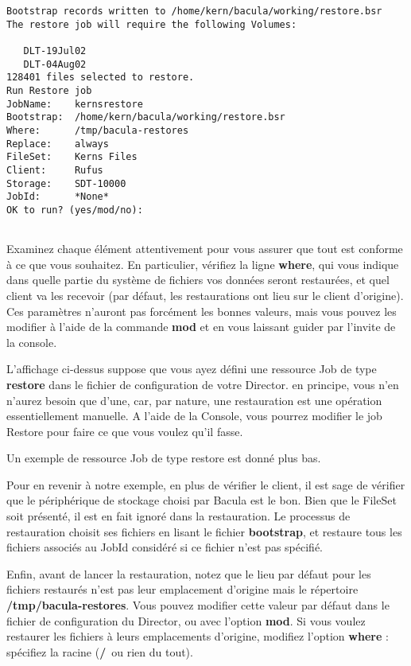 \footnotesize
\begin{verbatim}
Bootstrap records written to /home/kern/bacula/working/restore.bsr
The restore job will require the following Volumes:
   
   DLT-19Jul02
   DLT-04Aug02
128401 files selected to restore.
Run Restore job
JobName:    kernsrestore
Bootstrap:  /home/kern/bacula/working/restore.bsr
Where:      /tmp/bacula-restores
Replace:    always
FileSet:    Kerns Files
Client:     Rufus
Storage:    SDT-10000
JobId:      *None*
OK to run? (yes/mod/no):
    
\end{verbatim}
\normalsize

Examinez chaque \'el\'ement attentivement pour vous assurer que tout est 
conforme \`a ce que vous souhaitez. En particulier, v\'erifiez la ligne {\bf where}, 
qui vous indique dans quelle partie du syst\`eme de fichiers vos donn\'ees 
seront restaur\'ees, et quel client va les recevoir (par d\'efaut, les 
restaurations ont lieu sur le client d'origine). Ces param\`etres n'auront pas 
forc\'ement les bonnes valeurs, mais vous pouvez les modifier \`a l'aide 
de la commande {\bf mod} et en vous laissant guider par l'invite de la 
console.

L'affichage ci-dessus suppose que vous ayez d\'efini une ressource Job de type 
{\bf restore} dans le fichier de configuration de votre Director. en 
principe, vous n'en n'aurez besoin que d'une, car, par nature, une 
restauration est une op\'eration essentiellement manuelle. A l'aide de la 
Console, vous pourrez modifier le job Restore pour faire ce que vous voulez 
qu'il fasse.

Un exemple de ressource Job de type restore est donn\'e plus bas.

Pour en revenir \`a notre exemple, en plus de v\'erifier le client, il est sage 
de v\'erifier que le p\'eriph\'erique de stockage choisi par Bacula est le bon. 
Bien que le FileSet soit pr\'esent\'e, il est en fait ignor\'e dans la restauration. 
Le processus de restauration choisit ses fichiers en lisant le fichier 
{\bf bootstrap}, et restaure tous les fichiers associ\'es au JobId consid\'er\'e 
si ce fichier n'est pas sp\'ecifi\'e. 

Enfin, avant de lancer la restauration, notez que le lieu par d\'efaut pour les 
fichiers restaur\'es n'est pas leur emplacement d'origine mais le r\'epertoire 
{\bf /tmp/bacula-restores}. Vous pouvez modifier cette valeur par d\'efaut dans 
le fichier de configuration du Director, ou avec l'option {\bf mod}. Si vous 
voulez restaurer les fichiers \`a leurs emplacements d'origine, modifiez l'option 
{\bf where} : sp\'ecifiez la racine ({\bf /} ou rien du tout).

